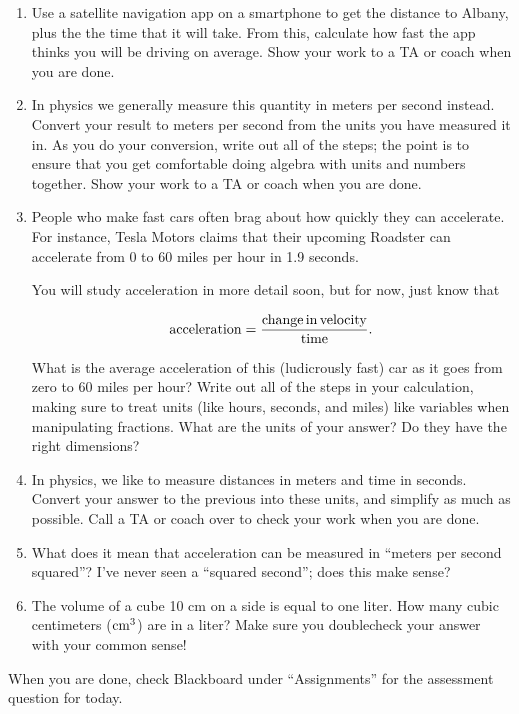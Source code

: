 \documentclass[12pt]{article}
\begin{document}
\begin{enumerate}
	\vspace{2in}
	
	\item Use a satellite navigation app on a smartphone to get the distance to Albany, plus the the time that it will take.
	From this, calculate how fast the app thinks you will be driving on average. Show your work to a TA or coach when you are done.
	
	\vspace{2in}
	
	\item In physics we generally measure this quantity in meters per second instead.
	Convert your result to meters per second from the units you have measured it in. As you do your conversion, write out all of the
	steps; the point is to ensure that you get comfortable doing algebra with units and numbers together. Show your work to a TA
	or coach when you are done.
	
	\vspace{2.5in}
	
	
	\item People who make fast cars often brag about how quickly they can accelerate. For instance, Tesla Motors claims that
	their upcoming Roadster can accelerate from 0 to 60 miles per hour in 1.9 seconds.
	
	You will study acceleration in more detail soon, but for now, just know that
	
	$$
	{\rm acceleration} = \frac{\rm change\, in\, velocity}{\rm time}.
	$$
	
	What is the average acceleration of this (ludicrously fast) car as it goes from zero to 60 miles per hour? Write out all of the
	steps in your calculation, making sure to treat units (like hours, seconds, and miles) like variables when manipulating fractions.
	What are the units of your answer? Do they have the right dimensions?
	
	\vspace{2in}
	\newpage
	\item In physics, we like to measure distances in meters and time in seconds. Convert your answer to the previous into these
	units, and simplify as much as possible. Call a TA or coach over to check your work when you are done.
	
	\vspace{2in}
	
	\item What does it mean that acceleration can be measured in ``meters per second squared''? I've never seen a ``squared second'';
	does this make sense?
	
	\vspace{1in}
	
	\item The volume of a cube 10 cm on a side is equal to one liter. How many cubic centimeters (${\rm cm}^3$) are in a liter?
	Make sure you doublecheck your answer with your common sense!
	
	
	\end{enumerate}
	\vfill
	
{\bf \begin{center}
	When you are done, check Blackboard under ``Assignments'' for the assessment question for today.
	\end{center}}

	
	
\end{document}
